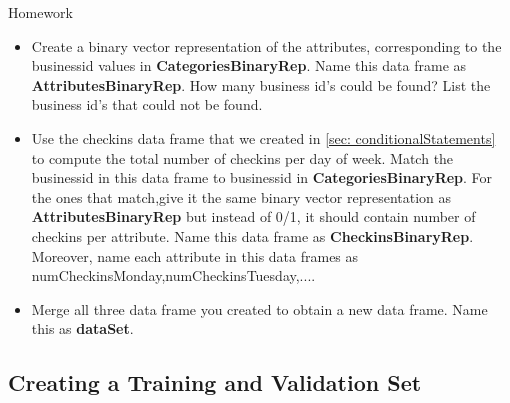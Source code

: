 \documentclass[12pt]{book}\usepackage{knitr}
\begin{document}
\begin{DIY}{Homework}
  \begin{itemize}
  \item Create a binary vector representation of the attributes, corresponding to the business\textunderscore id values in \textbf{CategoriesBinaryRep}. Name this data frame as \textbf{AttributesBinaryRep}. How many business id's could be found? List the business id's that could not be found. 
  \item Use the checkins data frame that we created in \ref{sec: conditionalStatements} to compute the total number of checkins per day of week. Match the business\textunderscore id in this data frame to business\textunderscore id in \textbf{CategoriesBinaryRep}. For the ones that match,give it the same binary vector representation as \textbf{AttributesBinaryRep} but instead of 0/1, it should contain number of checkins per attribute. Name this data frame as \textbf{CheckinsBinaryRep}. Moreover, name each attribute in this data frames as numCheckins\textunderscore Monday,numCheckins\textunderscore Tuesday,....   
  \item Merge all three data frame you created to obtain a new data frame. Name this as \textbf{dataSet}.
\end{itemize}
\end{DIY}



\newpage
\subsection{Creating a Training and Validation Set}
\begin{HIGHLIGHT}
\par{}
\end{HIGHLIGHT}
\end{document}
